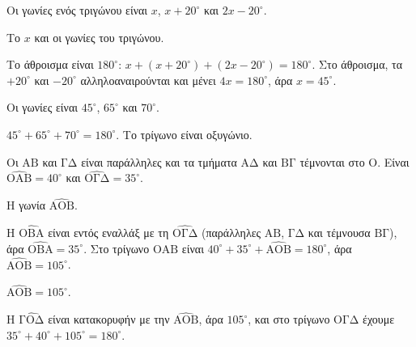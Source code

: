 \tixero Οι γωνίες ενός τριγώνου είναι $x$, $x+20^\circ$ και $2x-20^\circ$.\par
\tithelo Το $x$ και οι γωνίες του τριγώνου.\par
\possindeo Το άθροισμα είναι $180^\circ$: $x+(x+20^\circ)+(2x-20^\circ)=180^\circ$. Στο άθροισμα, τα $+20^\circ$ και $-20^\circ$ αλληλοαναιρούνται και μένει $4x=180^\circ$, άρα $x=45^\circ$.\par
\apantisi Οι γωνίες είναι $45^\circ$, $65^\circ$ και $70^\circ$.\par
\elegxos $45^\circ+65^\circ+70^\circ=180^\circ$. Το τρίγωνο είναι οξυγώνιο.

\tixero Οι $\mathrm{ΑΒ}$ και $\mathrm{ΓΔ}$ είναι παράλληλες και τα τμήματα $\mathrm{ΑΔ}$ και $\mathrm{ΒΓ}$ τέμνονται στο $\mathrm{Ο}$. Είναι $\widehat{\mathrm{ΟΑΒ}}=40^\circ$ και $\widehat{\mathrm{ΟΓΔ}}=35^\circ$.\par
\tithelo Η γωνία $\widehat{\mathrm{ΑΟΒ}}$.\par
\possindeo Η $\widehat{\mathrm{ΟΒΑ}}$ είναι εντός εναλλάξ με τη $\widehat{\mathrm{ΟΓΔ}}$ (παράλληλες $\mathrm{ΑΒ}$, $\mathrm{ΓΔ}$ και τέμνουσα $\mathrm{ΒΓ}$), άρα $\widehat{\mathrm{ΟΒΑ}}=35^\circ$. Στο τρίγωνο $\mathrm{ΟΑΒ}$ είναι $40^\circ+35^\circ+\widehat{\mathrm{ΑΟΒ}}=180^\circ$, άρα $\widehat{\mathrm{ΑΟΒ}}=105^\circ$.\par
\apantisi $\widehat{\mathrm{ΑΟΒ}}=105^\circ$.\par
\elegxos Η $\widehat{\mathrm{ΓΟΔ}}$ είναι κατακορυφήν με την $\widehat{\mathrm{ΑΟΒ}}$, άρα $105^\circ$, και στο τρίγωνο $\mathrm{ΟΓΔ}$ έχουμε $35^\circ+40^\circ+105^\circ=180^\circ$.

\begin{center}
\end{center}

